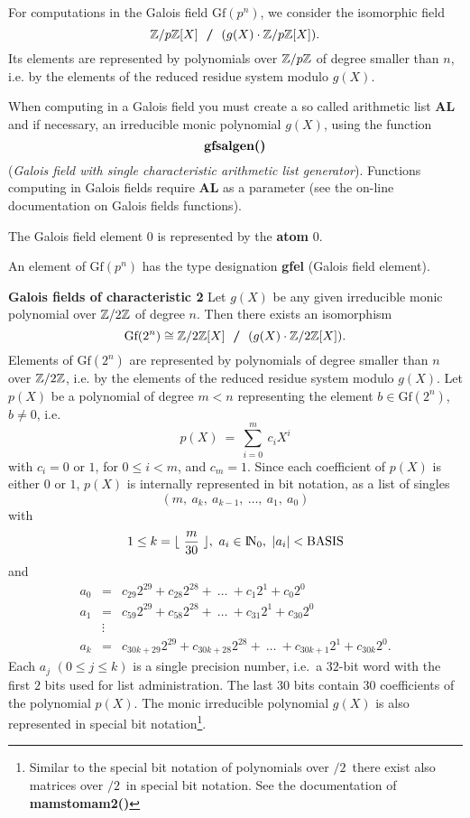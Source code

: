 For computations in the Galois field $\mbox{Gf}(p^n)$, we consider 
the isomorphic field
$$ 
       \mbox{$\mathbb Z$}/p\mbox{$\mathbb Z$} [X]\ \mbox{\hspace*{3pt}{\bf /}\hspace*{3pt}}\ (g(X) \cdot \mbox{$\mathbb Z$}/p\mbox{$\mathbb Z$} [X]).
$$ 
Its elements are represented by polynomials over $\mbox{$\mathbb Z$}/p\mbox{$\mathbb Z$}$ of degree
smaller than $n$, i.e.\/ by the elements of the reduced residue system
modulo $g(X)$.

When computing in a Galois field you must create a so called
arithmetic list {\bf AL} 
and if necessary, an irreducible monic polynomial {\bf $g(X)$},
using the function  
$$
\mbox{{\bf gfsalgen()}} 
$$ 
({\em Galois field with single characteristic arithmetic list generator}).
Functions computing in Galois fields require {\bf AL} as a parameter 
(see the on-line documentation on Galois fields functions).

The Galois field element $0$ is represented by the {\bf atom} $0$.

An element of $\mbox{Gf}(p^n)$ has the type designation {\bf gfel} (Galois field element).

\leer
{\bf Galois fields of characteristic 2}
\leer 
Let {\bf $g(X)$} be any given irreducible monic polynomial over $\mbox{$\mathbb Z$}/2\mbox{$\mathbb Z$}$ of degree $n$.
Then there exists an isomorphism
$$ 
\mbox{Gf}(2^n) \cong \Z/2\Z [X]\ \mbox{\hspace*{3pt}{\bf /}\hspace*{3pt}}\ (g(X) \cdot \Z/2\Z [X]) .
$$
Elements of $\mbox{Gf}(2^n)$ are represented by polynomials of degree smaller than $n$ over $\mbox{$\mathbb Z$}/2\mbox{$\mathbb Z$}$,
i.e. by the elements of the reduced residue system modulo $g(X)$.
Let {\bf $p(X)$} be a polynomial of degree $m < n$ 
representing the element $b \in \mbox{Gf}(2^n)$, $b \neq 0$, i.e.\/
$$
p(X)\ =\ \sum_{i=0}^m\ c_i X^i
$$ 
with $c_i=0$ or $1$, for $0\leq i < m$, and $c_m=1$.
Since each coefficient of $p(X)$ is either $0$ or $1$, $p(X)$ is internally 
represented in bit notation, as a list of singles
$$ 
(m,\ a_k,\ a_{k-1},\ \ldots,\ a_1,\ a_0)
$$
with   
$$ 
1 \leq k = \lfloor {\  \frac{m}{30} \ }
\rfloor,\  a_i \in \N_0,\  |a_i| < {\bf \rm BASIS}
$$
 and
\begin{eqnarray*}
a_0&=&c_{29} 2^{29} + c_{28} 2^{28} + \ \ldots \ + c_1 2^1 + c_0 2^0\\
a_1&=&c_{59} 2^{29} + c_{58} 2^{28} + \ \ldots \ + c_{31} 2^1 + c_{30} 2^0\\
& \vdots \\
a_k&=&c_{30k+29} 2^{29} + c_{30k+28} 2^{28} + \ \ldots
\ + c_{30k+1} 2^1 + c_{30k}  2^0.
\end{eqnarray*}
Each $a_j$ $(0 \leq j \leq k)$ is a single precision number, i.e.\ a $32$-bit 
word with the first $2$ bits used for list administration. The last $30$ bits
contain $30$ coefficients of the polynomial $p(X)$.
The monic irreducible polynomial $g(X)$ is also represented in 
special bit notation\footnote{ Similar to the special bit notation of 
polynomials over \Zklein$/2$\Zklein\ there exist also matrices over \Zklein$/2$\Zklein\ in special 
bit notation. See the documentation of {\bf mamstomam2()}}.

